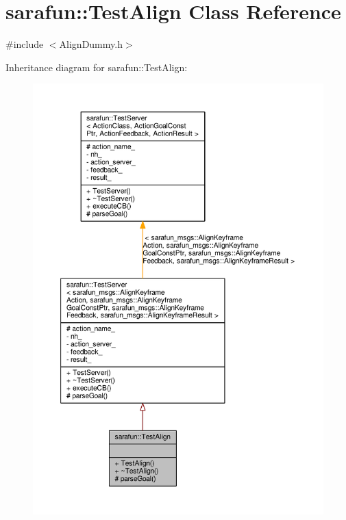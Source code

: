 \hypertarget{classsarafun_1_1TestAlign}{\section{sarafun\-:\-:Test\-Align Class Reference}
\label{classsarafun_1_1TestAlign}
}


{\ttfamily \#include $<$Align\-Dummy.\-h$>$}



Inheritance diagram for sarafun\-:\-:Test\-Align\-:
\nopagebreak
\begin{figure}[H]
\begin{center}
\leavevmode
\includegraphics[width=350pt]{df/d5d/classsarafun_1_1TestAlign__inherit__graph}
\end{center}
\end{figure}


